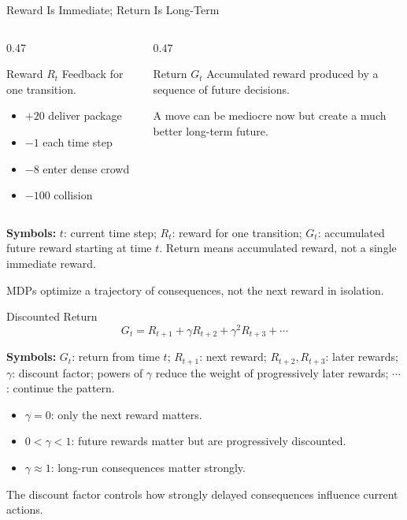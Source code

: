 \documentclass[aspectratio=169,10pt]{beamer}
\newcommand{\equationlegend}[1]{%
  \par\smallskip
  \begingroup
    \setlength{\fboxsep}{4pt}%
    \noindent\colorbox{DeckSoft}{%
      \parbox{\dimexpr\linewidth-2\fboxsep\relax}{%
        \footnotesize\textbf{Symbols:} #1%
      }%
    }\par
  \endgroup
  \smallskip
}
\begin{document}
\begin{frame}[shrink=10]{Reward Is Immediate; Return Is Long-Term}
  \begin{columns}[T,onlytextwidth]
    \begin{column}{0.47\textwidth}
      \begin{block}{Reward $R_t$}
        Feedback for one transition.
        \begin{itemize}
          \item $+20$ deliver package
          \item $-1$ each time step
          \item $-8$ enter dense crowd
          \item $-100$ collision
        \end{itemize}
      \end{block}
    \end{column}
    \begin{column}{0.47\textwidth}
      \begin{block}{Return $G_t$}
        Accumulated reward produced by a sequence of future decisions.

        A move can be mediocre now but create a much better long-term future.
      \end{block}
    \end{column}
  \end{columns}

  \equationlegend{$t$: current time step; $R_t$: reward for one transition; $G_t$: accumulated future reward starting at time $t$. Return means accumulated reward, not a single immediate reward.}
  \begin{keyidea}
    MDPs optimize a trajectory of consequences, not the next reward in isolation.
  \end{keyidea}
\end{frame}

\begin{frame}[shrink=10]{Discounted Return}
  \[
    G_t=R_{t+1}+\gamma R_{t+2}+\gamma^2R_{t+3}+\cdots
  \]
  \equationlegend{$G_t$: return from time $t$; $R_{t+1}$: next reward; $R_{t+2},R_{t+3}$: later rewards; $\gamma$: discount factor; powers of $\gamma$ reduce the weight of progressively later rewards; $\cdots$: continue the pattern.}

  \begin{itemize}
    \item $\gamma=0$: only the next reward matters.
    \item $0<\gamma<1$: future rewards matter but are progressively discounted.
    \item $\gamma\approx1$: long-run consequences matter strongly.
  \end{itemize}

  \begin{keyidea}
    The discount factor controls how strongly delayed consequences influence current actions.
  \end{keyidea}
\end{frame}
\end{document}

